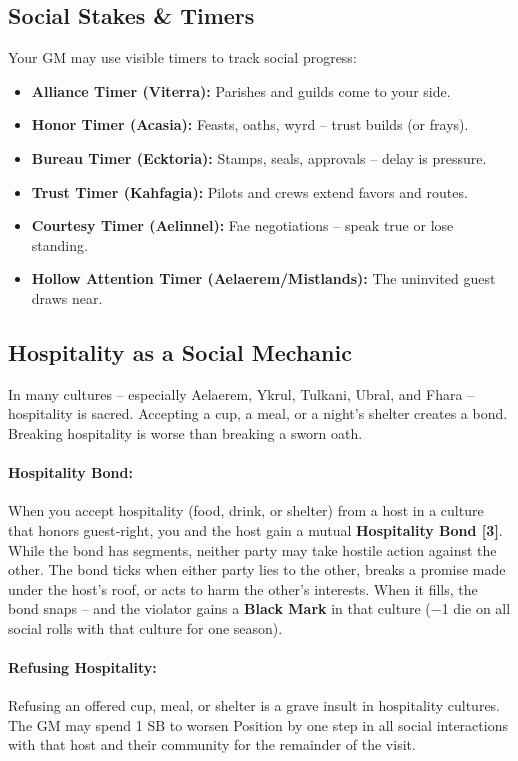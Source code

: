 \subsection*{Social Stakes \& Timers}
\label{sec:social-timers}
Your GM may use visible timers to track social progress:
\begin{itemize}
\item \textbf{Alliance Timer (Viterra):} Parishes and guilds come to your side.
\item \textbf{Honor Timer (Acasia):} Feasts, oaths, wyrd -- trust builds (or frays).
\item \textbf{Bureau Timer (Ecktoria):} Stamps, seals, approvals -- delay is pressure.
\item \textbf{Trust Timer (Kahfagia):} Pilots and crews extend favors and routes.
\item \textbf{Courtesy Timer (Aelinnel):} Fae negotiations -- speak true or lose standing.
\item \textbf{Hollow Attention Timer (Aelaerem/Mistlands):} The uninvited guest draws near.
\end{itemize}

\subsection*{Hospitality as a Social Mechanic}
\label{sec:hospitality}

In many cultures -- especially Aelaerem, Ykrul, Tulkani, Ubral, and Fhara -- hospitality is sacred. Accepting a cup, a meal, or a night's shelter creates a bond. Breaking hospitality is worse than breaking a sworn oath.

\paragraph{Hospitality Bond:} When you accept hospitality (food, drink, or shelter) from a host in a culture that honors guest‑right, you and the host gain a mutual \textbf{Hospitality Bond [3]}. While the bond has segments, neither party may take hostile action against the other. The bond ticks when either party lies to the other, breaks a promise made under the host's roof, or acts to harm the other's interests. When it fills, the bond snaps -- and the violator gains a \textbf{Black Mark} in that culture (−1 die on all social rolls with that culture for one season).

\paragraph{Refusing Hospitality:} Refusing an offered cup, meal, or shelter is a grave insult in hospitality cultures. The GM may spend 1 SB to worsen Position by one step in all social interactions with that host and their community for the remainder of the visit.

